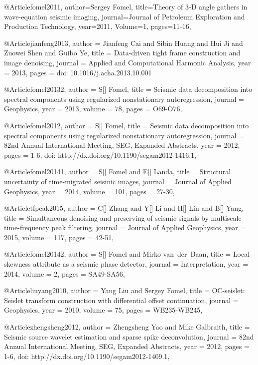 @Article{fomel2011,
  author={Sergey Fomel},
  title={Theory of 3-D angle gathers in wave-equation seismic imaging},
  journal={Journal of Petroleum Exploration and Production Technology},
  year=2011,
  Volume=1,
  pages={11-16},
}


@Article{jianfeng2013,
  author = 	 {Jianfeng Cai and Sibin Huang and Hui Ji and Zuowei Shen and Guibo Ye},
  title = 	 {Data-driven tight frame construction and image denoising},
  journal = 	 {Applied and Computational Harmonic Analysis},
  year = 	 2013,
  pages = 	 {doi: 10.1016/j.acha.2013.10.001}}

@Article{fomel20132,
  author = 	 {S[] Fomel},
  title = 	 {Seismic data decomposition into spectral components using regularized nonstationary autoregression},
  journal = 	 {Geophysics},
  year = 	 2013,
  volume =	 78,
  pages =	 {O69-O76},
}

@Article{fomel2012,
  author = 	 {S[] Fomel},
  title = 	 {Seismic data decomposition into spectral components using regularized nonstationary autoregression},
  journal = 	 {82nd Annual International Meeting, SEG, Expanded Abstracts},
  year = 	 2012,
  pages =	 {1-6, doi: http://dx.doi.org/10.1190/segam2012-1416.1},
}


@Article{fomel20141,
  author = 	 {S[] Fomel and E[] Landa},
  title = 	 {Structural uncertainty of time-migrated seismic images},
  journal = 	 {Journal of Applied Geophysics},
  year = 	 2014,
  volume =	 101,
  pages =	 {27-30},
}

@Article{tfpeak2015,
  author = 	 {C[] Zhang and Y[] Li and H[] Lin and B[] Yang},
  title = 	 {Simultaneous denoising and preserving of seismic signals by multiscale time-frequency peak filtering},
  journal = 	 {Journal of Applied Geophysics},
  year = 	 2015,
  volume =	 117,
  pages =	 {42-51},
}


@Article{fomel20142,
  author = 	 {S[] Fomel and Mirko van~der~Baan},
  title = 	 {Local skewness attribute as a seismic phase detector},
  journal = 	 {Interpretation},
  year = 	 2014,
  volume =	 2,
  pages =	 {SA49-SA56},
}

@Article{liuyang2010,
  author = 	 {Yang Liu and Sergey Fomel},
  title = 	 {OC-seislet: Seislet transform construction with differential offset continuation},
  journal = 	 {Geophysics},
  year = 	 2010,
  volume =	 75,
  pages =	 {WB235-WB245},
}

@Article{zhengsheng2012,
  author = 	 {Zhengsheng Yao and Mike Galbraith},
  title = 	 {Seismic source wavelet estimation and sparse spike deconvolution},
  journal = 	 {82nd Annual International Meeting, SEG, Expanded Abstracts},
  year = 	 2012,
  pages =	 {1-6, doi: http://dx.doi.org/10.1190/segam2012-1409.1},
}

